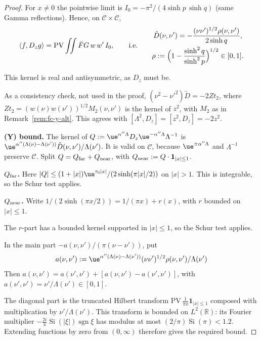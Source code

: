 \begin{proof}
For $x\neq0$ the pointwise limit is $I_0=-\pi^2/(4\sinh p\,\sinh q)$ (same Gamma reflections). Hence, on $\mathcal C\times\mathcal C$,
\[
\langle f,D_zg\rangle=\mathrm{PV}\iint\bar F G\,w\,w'\,I_0,
\qquad\text{i.e.}\qquad
\begin{gathered}
\tilde D(\nu,\nu')=-\frac{(\nu\nu')^{1/2}\rho(\nu,\nu')}{2\sinh q},\\
\rho:=\Bigl(1-\frac{\sinh^2q}{\sinh^2p}\Bigr)^{1/2}\in[0,1].
\end{gathered}
\]

This kernel is real and antisymmetric, as $D_z$ must be.

As a consistency check, not used in the proof, $(\nu^2-\nu'^2)\tilde D=-2Zt_2$, where
$Zt_2=(w(\nu)w(\nu'))^{1/2}M_2(\nu,\nu')$ is the kernel of $z^2$, with $M_2$ as in
Remark~\ref{rem:fc-y-alt}. This agrees with $[\Lambda^2,D_z]=[z^2,D_z]=-2z^2$.

\medskip\noindent\textbf{(Y) bound.} The kernel of $Q:=\ue^{\alpha''\Lambda}D_z\ue^{-\alpha''\Lambda}\Lambda^{-1}$ is $\ue^{\alpha''(\Lambda(\nu)-\Lambda(\nu'))}\tilde D(\nu,\nu')/\Lambda(\nu')$. It is valid on $\mathcal C$, because $\ue^{\pm\alpha''\Lambda}$ and $\Lambda^{-1}$ preserve $\mathcal C$. Split $Q=Q_{\rm far}+Q_{\rm near}$, with $Q_{\rm near}:=Q\cdot\mathbf 1_{|x|\le1}$.

\textbf{$Q_{\rm far}$.} Here $|Q|\le(1+|x|)\ue^{\tau_0|x|}/(2\sinh(\pi|x|/2))$ on $|x|>1$. This is integrable, so the Schur test applies.

\textbf{$Q_{\rm near}$.} Write $1/(2\sinh(\pi x/2))=1/(\pi x)+r(x)$, with $r$ bounded on $|x|\le1$.

The $r$-part has a bounded kernel supported in $|x|\le1$, so the Schur test applies.

In the main part $-a(\nu,\nu')/(\pi(\nu-\nu'))$, put
\[a(\nu,\nu'):=\ue^{\alpha''(\Lambda(\nu)-\Lambda(\nu'))}(\nu\nu')^{1/2}\rho(\nu,\nu')/\Lambda(\nu')\]
Then $a(\nu,\nu')=a(\nu',\nu')+[a(\nu,\nu')-a(\nu',\nu')]$, with $a(\nu',\nu')=\nu'/\Lambda(\nu')\in[0,1]$.

The diagonal part is the truncated Hilbert transform $\mathrm{PV}\,\frac{1}{\pi x}\mathbf 1_{|x|\le1}$
composed with multiplication by $\nu'/\Lambda(\nu')$. This transform is bounded on $L^2(\mathbb R)$:
its Fourier multiplier $-\tfrac{2i}{\pi}\operatorname{Si}(|\xi|)\operatorname{sgn}\xi$ has modulus
at most $(2/\pi)\operatorname{Si}(\pi)<1.2$. Extending functions by zero from $(0,\infty)$ therefore gives the required bound.


\end{proof}
